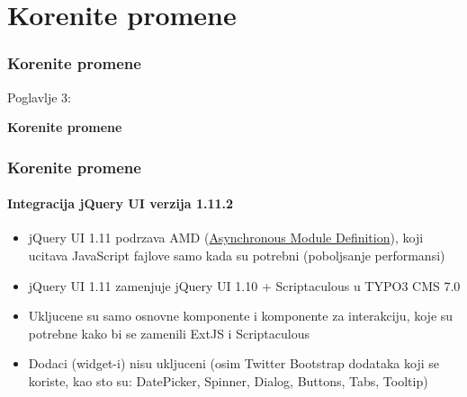 %

\section{Korenite promene}
\begin{frame}[fragile]
	\frametitle{Korenite promene}

	\begin{center}\huge{Poglavlje 3:}\end{center}
	\begin{center}\huge{\color{typo3darkgrey}\textbf{Korenite promene}}\end{center}

\end{frame}


\begin{frame}[fragile]
	\frametitle{Korenite promene}
	\framesubtitle{Integracija jQuery UI verzija 1.11.2}

	\begin{itemize}
		\item jQuery UI 1.11 podrzava AMD
			(\href{http://en.wikipedia.org/wiki/Asynchronous_module_definition}{Asynchronous Module Definition}),
			koji ucitava JavaScript fajlove samo kada su potrebni (poboljsanje performansi)

    	\item jQuery UI 1.11 zamenjuje jQuery UI 1.10 + Scriptaculous u TYPO3 CMS 7.0

    	\item Ukljucene su samo osnovne komponente i komponente za interakciju, koje su potrebne kako bi se zamenili ExtJS i Scriptaculous

    	\item Dodaci (widget-i) nisu ukljuceni (osim Twitter Bootstrap dodataka koji se koriste, kao sto su: DatePicker, Spinner, Dialog, Buttons, Tabs, Tooltip)

	\end{itemize}

\end{frame}


